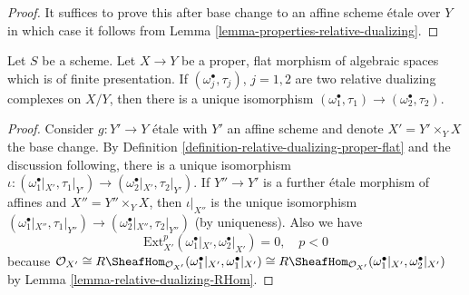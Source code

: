\begin{proof}
It suffices to prove this after base change to an affine scheme \'etale
over $Y$ in which case it follows from
Lemma \ref{lemma-properties-relative-dualizing}.
\end{proof}

\begin{lemma}
\label{lemma-uniqueness-relative-dualizing}
Let $S$ be a scheme. Let $X \to Y$ be a proper, flat morphism of
algebraic spaces which is of finite presentation.
If $(\omega_j^\bullet, \tau_j)$, $j = 1, 2$
are two relative dualizing complexes on $X/Y$,
then there is a unique isomorphism
$(\omega_1^\bullet, \tau_1) \to (\omega_2^\bullet, \tau_2)$.
\end{lemma}

\begin{proof}
Consider $g : Y' \to Y$ \'etale with $Y'$ an affine scheme
and denote $X' = Y' \times_Y X$ the base change.
By Definition \ref{definition-relative-dualizing-proper-flat}
and the discussion following, there is a unique isomorphism
$\iota : (\omega_1^\bullet|_{X'}, \tau_1|_{Y'}) \to
(\omega_2^\bullet|_{X'}, \tau_2|_{Y'})$. If $Y'' \to Y'$
is a further \'etale morphism of affines and $X'' = Y'' \times_Y X$,
then $\iota|_{X''}$ is the unique isomorphism
$(\omega_1^\bullet|_{X''}, \tau_1|_{Y''}) \to
(\omega_2^\bullet|_{X''}, \tau_2|_{Y''})$ (by uniqueness).
Also we have
$$
\text{Ext}^p_{X'}(\omega_1^\bullet|_{X'}, \omega_2^\bullet|_{X'}) = 0,
\quad p < 0
$$
because
$\mathcal{O}_{X'} \cong
R\SheafHom_{\mathcal{O}_{X'}}(\omega_1^\bullet|_{X'}, \omega_1^\bullet|_{X'})
\cong
R\SheafHom_{\mathcal{O}_{X'}}(\omega_1^\bullet|_{X'}, \omega_2^\bullet|_{X'})$
by Lemma \ref{lemma-relative-dualizing-RHom}.


\end{proof}
